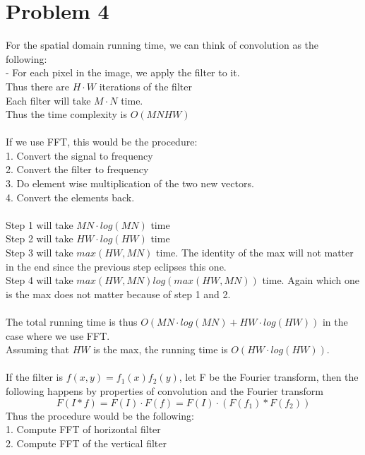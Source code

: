 \documentclass[11pt,psfig]{article}
\begin{document}
\newpage

\section*{Problem 4}

For the spatial domain running time, we can think of convolution as the following:\\
- For each pixel in the image, we apply the filter to it. \\
Thus there are $H \cdot W$ iterations of the filter\\
Each filter will take $M \cdot N$ time. \\
Thus the time complexity is $O(MNHW)$\\
\\
If we use FFT, this would be the procedure:\\
1. Convert the signal to frequency\\
2. Convert the filter to frequency \\
3. Do element wise multiplication of the two new vectors. \\
4. Convert the elements back. \\
\\
Step 1 will take $MN \cdot log(MN)$ time\\
Step 2 will take $HW \cdot log(HW)$ time\\
Step 3 will take $max(HW,MN)$ time. The identity of the max will not matter in the end since the previous step eclipses this one. \\
Step 4 will take $max(HW,MN) log( max(HW, MN) )$ time. Again which one is the max does not matter because of step 1 and 2. \\
\\
The total running time is thus $O(MN \cdot log(MN) + HW \cdot log(HW) )$ in the case where we use FFT. \\
Assuming that $HW$ is the max, the running time is $O(HW \cdot log(HW))$. \\
\\
If the filter is $f(x,y) = f_1(x)f_2(y)$, let F be the Fourier transform, then the following happens by properties of convolution and the Fourier transform\\
\[
F( I*f ) = F(I) \cdot F(f) = F(I) \cdot (F(f_1) * F(f_2))
\]
Thus the procedure would be the following:\\
1. Compute FFT of horizontal filter\\
2. Compute FFT of the vertical filter\\
\end{document}
